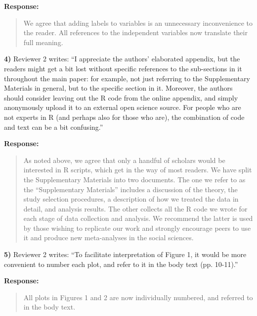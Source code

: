 \documentclass[a4paper,12pt]{article}
\begin{document}
\vspace{.3cm}

\noindent \textbf{Response:} 
\begin{quote}
    We agree that adding labels to variables is an unnecessary inconvenience to the reader. All references to the independent variables now translate their full meaning.
\end{quote}

\vspace{.3cm}

\noindent \textbf{4)} Reviewer 2 writes: ``I appreciate the authors' elaborated appendix, but the readers might get a bit lost without specific references to the sub-sections in it throughout the main paper: for example, not just referring to the Supplementary Materials in general, but to the specific section in it. Moreover, the authors should consider leaving out the R code from the online appendix, and simply anonymously upload it to an external open science source. For people who are not experts in R (and perhaps also for those who are), the combination of code and text can be a bit confusing.''

\vspace{.3cm}

\noindent \textbf{Response:} 
\begin{quote}
    As noted above, we agree that only a handful of scholars would be interested in R scripts, which get in the way of most readers. We have split the Supplementary Materials into two documents. The one we refer to as the ``Supplementary Materials'' includes a discussion of the theory, the study selection procedures, a description of how we treated the data in detail, and analysis results. The other collects all the R code we wrote for each stage of data collection and analysis. We recommend the latter is used by those wishing to replicate our work and strongly encourage peers to use it and produce new meta-analyses in the social sciences.
\end{quote}

\vspace{.3cm}

\noindent \textbf{5)} Reviewer 2 writes: ``To facilitate interpretation of Figure 1, it would be more convenient to number each plot, and refer to it in the body text (pp. 10-11).''

\vspace{.3cm}

\noindent \textbf{Response:} 
\begin{quote}
    All plots in Figures 1 and 2 are now individually numbered, and referred to in the body text.
\end{quote}
\end{document}
